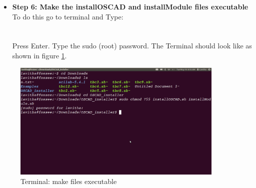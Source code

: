 \begin{itemize}
\item{\textbf{Step 6: Make the installOSCAD and installModule files executable }}\\
To do this go to terminal and Type:\\
\newline
{}\\\\
Press Enter. 
Type the sudo (root) password. 
The Terminal should look like as shown in figure \ref{term}.
\end{itemize}
\newpage
\begin{figure}[h!]
\centering
\includegraphics[width=0.9\textwidth]{figures/install3.png}
\caption{Terminal: make files executable}
\label{term}
\end{figure}
